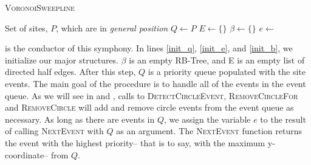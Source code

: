 \documentclass[12pt,twoside]{reedthesis}
\begin{document}
    \begin{algorithm}[H]
    \caption{\textsc{VoronoiSweepline}}\label{VoronoiSweepline}
    \begin{algorithmic}[1]
    \Require Set of sites, $P$, which are in \emph{general position}
    \State $Q\gets P$ \label{init_q} 
    \State $E\gets \{\}$ \label{init_e} 
    \State $\beta\gets \{\}$ \label{init_b}
     \label{vs_while}
      \State $e\gets$ 
        \State{}
      \Else
        \State{}
      \EndIf
    \EndWhile \label{vs_while_end}
    \EndProcedure
    \end{algorithmic} 
    \end{algorithm}

     is the conductor of this symphony. In lines \ref{init_q}, \ref{init_e}, and \ref{init_b}, we initialize our major structures. $\beta$ is an empty RB-Tree, and E is an empty list of directed half edges. After this step, $Q$ is a priority queue populated with the site events. The main goal of the  procedure is to handle all of the events in the event queue. As we will see in  and , calls to \textsc{DetectCircleEvent, RemoveCircleFor} and \textsc{RemoveCircle} will add and remove circle events from the event queue as necessary. As long as there are events in $Q$, we assign the variable $e$ to the result of calling \textsc{NextEvent} with $Q$ as an argument. The \textsc{NextEvent} function returns the event with the highest priority-- that is to say, with the maximum y-coordinate-- from $Q$.\par
\end{document}
